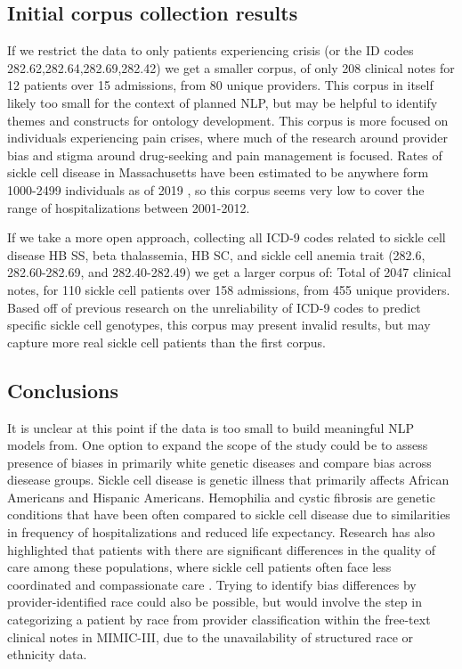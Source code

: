 \documentclass[12pt]{article} %
\begin{document}
\subsection{Initial corpus collection results}

If we restrict the data to only patients experiencing crisis (or the ID codes 282.62,282.64,282.69,282.42) we get a smaller corpus, of only 208 clinical notes for 12 patients over 15 admissions, from 80 unique providers. This corpus in itself likely too small for the context of planned NLP, but may be helpful to identify themes and constructs for ontology development. This corpus is more focused on individuals experiencing pain crises, where much of the research around provider bias and stigma around drug-seeking and pain management is focused. Rates of sickle cell disease in Massachusetts have been estimated to be anywhere form 1000-2499 individuals as of 2019 \cite{rethink_scd_sickle_2019}, so this corpus seems very low to cover the range of hospitalizations between 2001-2012. 

If we take a more open approach, collecting all ICD-9 codes related to sickle cell disease HB SS, beta thalassemia, HB SC, and sickle cell anemia trait (282.6, 282.60-282.69, and 282.40-282.49) we get a larger corpus of: Total of 2047 clinical notes, for 110 sickle cell patients over 158 admissions, from 455 unique providers. Based off of previous research on the unreliability of ICD-9 codes to predict specific sickle cell genotypes, this corpus may present invalid results, but may capture more real sickle cell patients than the first corpus. 

\subsection{Conclusions}

It is unclear at this point if the data is too small to build meaningful NLP models from. One option to expand the scope of the study could be to assess presence of biases in primarily white genetic diseases and compare bias across diesease groups. Sickle cell disease is genetic illness that primarily affects African Americans and Hispanic Americans. Hemophilia and cystic fibrosis are genetic conditions that have been often compared to sickle cell disease due to similarities in frequency of hospitalizations and reduced life expectancy. Research has also highlighted that patients with there are significant differences in the quality of care among these populations, where sickle cell patients often face less coordinated and compassionate care \cite{grosse_models_2009}. Trying to identify bias differences by provider-identified race could also be possible, but would involve the step in categorizing a patient by race from provider classification within the free-text clinical notes in MIMIC-III, due to the unavailability of structured race or ethnicity data. 
\end{document}
